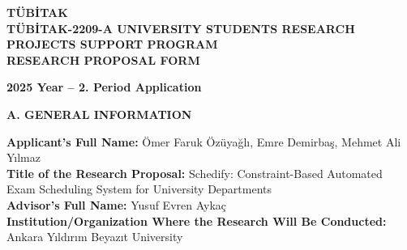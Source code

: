 \documentclass[10pt,a4paper]{article}
\newcommand{\sectionlabel}[1]{\vspace{1.2em}\noindent\textbf{\fontsize{10.5}{12}\selectfont #1}\par\vspace{0.4em}}
\begin{document}
\thispagestyle{firstpage}

\vspace*{3cm}
\begin{center}
    \textbf{\Huge TÜBİTAK}\\[2.5cm]
    {\Large\bfseries TÜBİTAK-2209-A UNIVERSITY STUDENTS RESEARCH PROJECTS SUPPORT PROGRAM}\\[1.5cm]
    {\large\bfseries RESEARCH PROPOSAL FORM}\\[2.5cm]
\end{center}
\vfill
\begin{flushright}
    \textbf{2025 Year -- 2. Period Application}
\end{flushright}

\clearpage


\sectionlabel{A. GENERAL INFORMATION}
\begin{tcolorbox}
\textbf{Applicant's Full Name:} Ömer Faruk Özüyağlı, Emre Demirbaş, Mehmet Ali Yılmaz \\[0.6em]
\textbf{Title of the Research Proposal:} Schedify: Constraint-Based Automated Exam Scheduling System for University Departments \\[0.6em]
\textbf{Advisor's Full Name:} Yusuf Evren Aykaç \\[0.6em]
\textbf{Institution/Organization Where the Research Will Be Conducted:} Ankara Yıldırım Beyazıt University
\end{tcolorbox}
\end{document}
